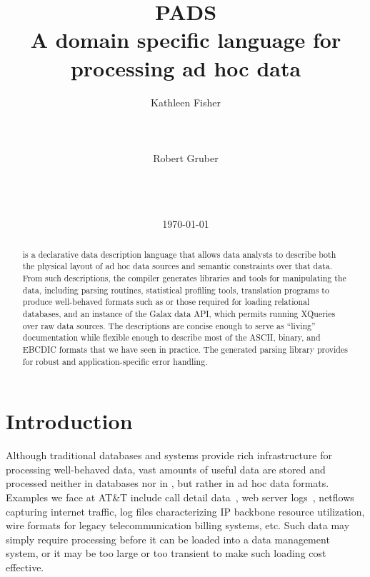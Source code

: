 \documentclass{sig-alternate}
\begin{document}
\title{PADS\\ A domain specific language for processing ad hoc data}

\author{
\alignauthor Kathleen Fisher\\
       \\
       \\
       \\
\alignauthor Robert Gruber\\
       \\
       \\
       \\
}

\date{\today}
\maketitle
\begin{abstract}
\pads{} is a declarative data description language that allows data
analysts to describe both the physical layout of ad hoc data sources
and semantic constraints over that data.  From such descriptions, the
\pads{} compiler generates libraries and tools for manipulating the
data, including parsing routines, statistical profiling tools,
translation programs to produce well-behaved
formats such as \xml{} or those required for loading relational
databases, and an instance of the Galax data API, which permits
running XQueries over raw \pads{} data sources.
The descriptions are concise enough to serve as ``living'' documentation
while flexible enough to describe most of the ASCII, binary, and
EBCDIC formats that we have seen in practice.  The generated parsing
library provides for robust and application-specific error handling.
\end{abstract}

\section{Introduction}


Although traditional databases and \xml{} systems provide rich
infrastructure for processing well-behaved data, vast amounts of
useful data are stored and processed neither in databases nor in
\xml{}, but rather in ad hoc data formats. 
Examples we face at AT\&T include call detail data~\cite{kdd00}, 
web server logs~\cite{wpp}, 
netflows capturing internet traffic\cite{netflow}, 
log files characterizing IP backbone resource utilization,
wire formats for legacy telecommunication billing systems, 
etc{}. 
Such data may simply require processing before it can be loaded into a
data management system, or it may be too large or too transient to
make such loading cost effective.
\end{document}
